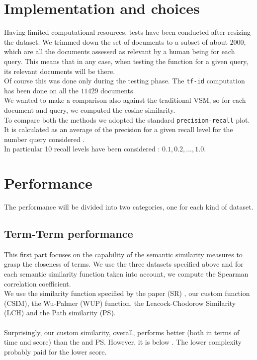 \documentclass[letterpaper, 10 pt, conference]{ieeeconf}  %
\begin{document}
\section{Implementation and choices}
Having limited computational resources, tests have been conducted after resizing the dataset. We trimmed down the set of documents to a subset of about $2000$, which are all the documents assessed as relevant by a human being for each query. This means that in any case, when testing the function for a given query, its relevant documents will be there.\\
Of course this was done only during the testing phase. The \texttt{tf-id} computation has been done on all the $11429$ documents.\\
We wanted to make a comparison also against the traditional VSM, so for each document and query, we computed the cosine similarity.\\
To compare both the methods we adopted the standard \texttt{precision-recall} plot.
It is calculated as an average of the precision for a given recall level for the number  query considered .\\In particular 10 recall levels have been considered : $ 0.1, 0.2, ... , 1.0 $.\\%
\section{Performance}
The performance will be divided into two categories, one for each kind of dataset.
\subsection{Term-Term performance}
This first part focuses on the capability of the semantic similarity measures to grasp the closeness of terms. We use the three datasets specified above and for each semantic similarity function taken into account, we compute the Spearman correlation coefficient.\\
We use the similarity function specified by the paper (SR) \cite{c1}, our custom function (CSIM), the Wu-Palmer (WUP) \cite{c3} function, the Leacock-Chodorow Similarity (LCH) \cite{c4} and the Path similarity (PS).\\   \\
Surprisingly, our custom similarity, overall, performs better (both in terms of time and score) than the \cite{c3} \cite{c4} and PS. However, it is below \cite{c1}. The lower complexity probably paid for the lower score.
\end{document}
